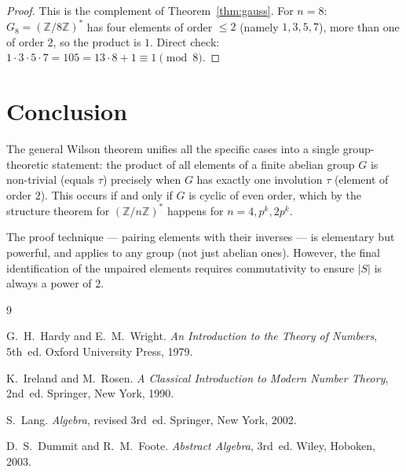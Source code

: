 \documentclass[12pt,a4paper]{amsart}
\theoremstyle{definition}
\newcommand{\Z}{\mathbb{Z}}
\begin{document}
\begin{proof}
  This is the complement of Theorem~\ref{thm:gauss}.  For $n = 8$:
  $G_8 = (\Z/8\Z)^*$ has four elements of order $\leq 2$ (namely $1,3,5,7$),
  more than one of order $2$, so the product is $1$.
  Direct check: $1 \cdot 3 \cdot 5 \cdot 7 = 105 = 13 \cdot 8 + 1 \equiv 1 \pmod 8$. \checkmark
\end{proof}

\section{Conclusion}

The general Wilson theorem unifies all the specific cases into a single
group-theoretic statement: the product of all elements of a finite abelian
group $G$ is non-trivial (equals $\tau$) precisely when $G$ has exactly one
involution $\tau$ (element of order $2$).  This occurs if and only if $G$ is
cyclic of even order, which by the structure theorem for $(\Z/n\Z)^*$ happens
for $n = 4, p^k, 2p^k$.

The proof technique — pairing elements with their inverses — is elementary
but powerful, and applies to any group (not just abelian ones).
However, the final identification of the unpaired elements requires commutativity
to ensure $|S|$ is always a power of $2$.

\begin{thebibliography}{9}

G.~H.~Hardy and E.~M.~Wright.
\newblock \emph{An Introduction to the Theory of Numbers}, 5th~ed.
\newblock Oxford University Press, 1979.

K.~Ireland and M.~Rosen.
\newblock \emph{A Classical Introduction to Modern Number Theory}, 2nd~ed.
\newblock Springer, New York, 1990.

S.~Lang.
\newblock \emph{Algebra}, revised 3rd~ed.
\newblock Springer, New York, 2002.

D.~S.~Dummit and R.~M.~Foote.
\newblock \emph{Abstract Algebra}, 3rd~ed.
\newblock Wiley, Hoboken, 2003.

\end{thebibliography}
\end{document}
